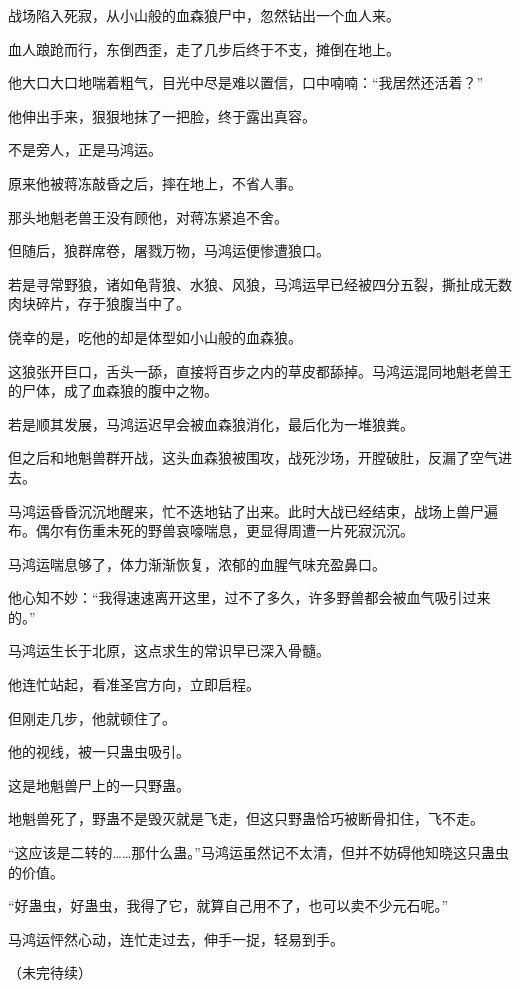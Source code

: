\begin{this_body}
战场陷入死寂，从小山般的血森狼尸中，忽然钻出一个血人来。

血人踉跄而行，东倒西歪，走了几步后终于不支，摊倒在地上。

他大口大口地喘着粗气，目光中尽是难以置信，口中喃喃：“我居然还活着？”

他伸出手来，狠狠地抹了一把脸，终于露出真容。

不是旁人，正是马鸿运。

原来他被蒋冻敲昏之后，摔在地上，不省人事。

那头地魁老兽王没有顾他，对蒋冻紧追不舍。

但随后，狼群席卷，屠戮万物，马鸿运便惨遭狼口。

若是寻常野狼，诸如龟背狼、水狼、风狼，马鸿运早已经被四分五裂，撕扯成无数肉块碎片，存于狼腹当中了。

侥幸的是，吃他的却是体型如小山般的血森狼。

这狼张开巨口，舌头一舔，直接将百步之内的草皮都舔掉。马鸿运混同地魁老兽王的尸体，成了血森狼的腹中之物。

若是顺其发展，马鸿运迟早会被血森狼消化，最后化为一堆狼粪。

但之后和地魁兽群开战，这头血森狼被围攻，战死沙场，开膛破肚，反漏了空气进去。

马鸿运昏昏沉沉地醒来，忙不迭地钻了出来。此时大战已经结束，战场上兽尸遍布。偶尔有伤重未死的野兽哀嚎喘息，更显得周遭一片死寂沉沉。

马鸿运喘息够了，体力渐渐恢复，浓郁的血腥气味充盈鼻口。

他心知不妙：“我得速速离开这里，过不了多久，许多野兽都会被血气吸引过来的。”

马鸿运生长于北原，这点求生的常识早已深入骨髓。

他连忙站起，看准圣宫方向，立即启程。

但刚走几步，他就顿住了。

他的视线，被一只蛊虫吸引。

这是地魁兽尸上的一只野蛊。

地魁兽死了，野蛊不是毁灭就是飞走，但这只野蛊恰巧被断骨扣住，飞不走。

“这应该是二转的……那什么蛊。”马鸿运虽然记不太清，但并不妨碍他知晓这只蛊虫的价值。

“好蛊虫，好蛊虫，我得了它，就算自己用不了，也可以卖不少元石呢。”

马鸿运怦然心动，连忙走过去，伸手一捉，轻易到手。

（未完待续）

\end{this_body}

